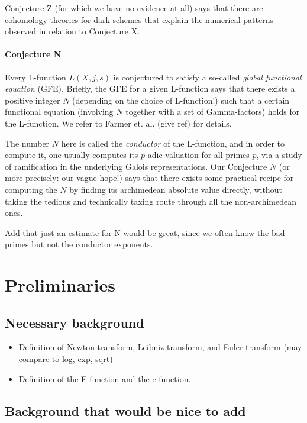 \documentclass[paper=a4, fontsize=11pt]{scrartcl} %
\numberwithin{equation}{section} %
\numberwithin{figure}{section} %
\numberwithin{table}{section} %
\begin{document}
Conjecture Z (for which we have no evidence at all) says that there are cohomology theories for dark schemes that explain the numerical patterns observed in relation to Conjecture X.


\paragraph{Conjecture N}

Every L-function $L(X, j, s)$ is conjectured to satisfy a so-called \emph{global functional equation} (GFE). Briefly, the GFE for a given L-function says that there exists a positive integer $N$ (depending on the choice of L-function!) such that a certain functional equation (involving $N$ together with a set of Gamma-factors) holds for the L-function. We refer to Farmer et. al. (give ref) for details.

The number $N$ here is called the \emph{conductor} of the L-function, and in order to compute it, one usually computes its $p$-adic valuation for all primes $p$, via a study of ramification in the underlying Galois representations. Our Conjecture $N$ (or more precisely: our vague hope!) says that there exists some practical recipe for computing the $N$ by finding its archimedean absolute value directly, without taking the tedious and technically taxing route through all the non-archimedean ones.

Add that just an estimate for N would be great, since we often know the bad primes but not the conductor exponents.


\section{Preliminaries}

\subsection{Necessary background}

\begin{itemize}
\item Definition of Newton transform, Leibniz transform, and Euler transform (may compare to log, exp, sqrt)
\item Definition of the E-function and the e-function.
\end{itemize}

\subsection{Background that would be nice to add}
\end{document}

